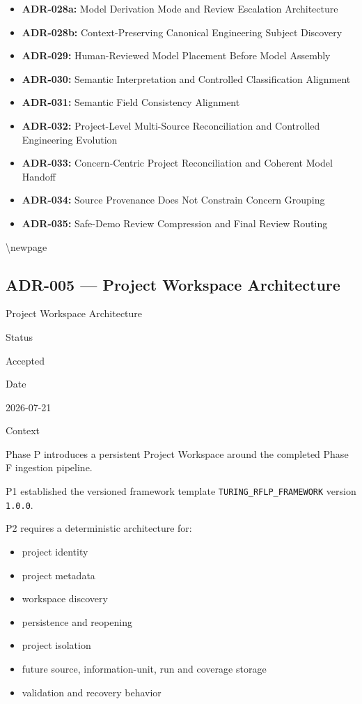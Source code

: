 \begin{itemize}
  \textbf{ADR-027:} Source-Grounded Evidence Detection and Persona Interpretation Architecture
\item
  \textbf{ADR-028a:} Model Derivation Mode and Review Escalation Architecture
\item
  \textbf{ADR-028b:} Context-Preserving Canonical Engineering Subject Discovery
\item
  \textbf{ADR-029:} Human-Reviewed Model Placement Before Model Assembly
\item
  \textbf{ADR-030:} Semantic Interpretation and Controlled Classification Alignment
\item
  \textbf{ADR-031:} Semantic Field Consistency Alignment
\item
  \textbf{ADR-032:} Project-Level Multi-Source Reconciliation and Controlled Engineering Evolution
\item
  \textbf{ADR-033:} Concern-Centric Project Reconciliation and Coherent Model Handoff
\item
  \textbf{ADR-034:} Source Provenance Does Not Constrain Concern Grouping
\item
  \textbf{ADR-035:} Safe-Demo Review Compression and Final Review Routing
\end{itemize}

\textbackslash newpage

\hypertarget{adr-005--project-workspace-architecture}{%
\subsection{ADR-005 --- Project Workspace Architecture}\label{adr-005--project-workspace-architecture}}

Project Workspace Architecture

Status

Accepted

Date

2026-07-21

Context

Phase P introduces a persistent Project Workspace around the completed Phase F ingestion pipeline.

P1 established the versioned framework template \texttt{TURING\_RFLP\_FRAMEWORK} version \texttt{1.0.0}.

P2 requires a deterministic architecture for:

\begin{itemize}
\tightlist
\item
  project identity
\item
  project metadata
\item
  workspace discovery
\item
  persistence and reopening
\item
  project isolation
\item
  future source, information-unit, run and coverage storage
\item
  validation and recovery behavior
\end{itemize}

